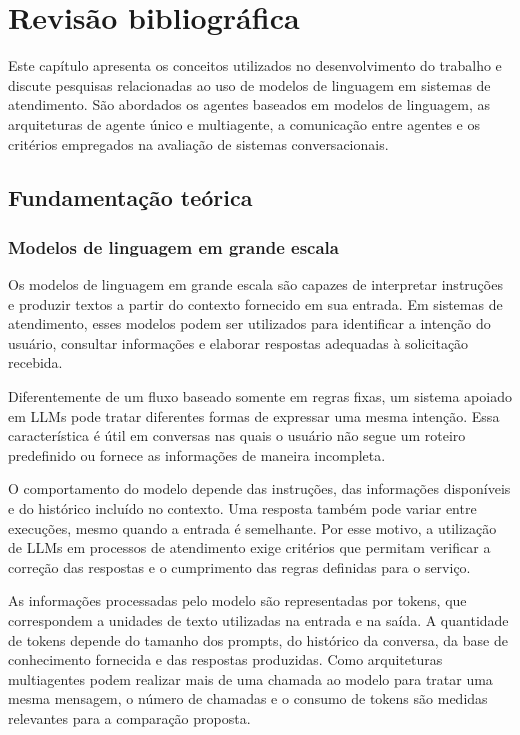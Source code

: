 \chapter{Revisão bibliográfica}\label{cap:revisao}

Este capítulo apresenta os conceitos utilizados no desenvolvimento do trabalho e discute pesquisas relacionadas ao uso de modelos de linguagem em sistemas de atendimento. São abordados os agentes baseados em modelos de linguagem, as arquiteturas de agente único e multiagente, a comunicação entre agentes e os critérios empregados na avaliação de sistemas conversacionais.

\section{Fundamentação teórica}\label{sec:fundamentacao}

\subsection{Modelos de linguagem em grande escala}
\label{subsec:llm}

Os modelos de linguagem em grande escala são capazes de interpretar instruções e produzir textos a partir do contexto fornecido em sua entrada. Em sistemas de atendimento, esses modelos podem ser utilizados para identificar a intenção do usuário, consultar informações e elaborar respostas adequadas à solicitação recebida.

Diferentemente de um fluxo baseado somente em regras fixas, um sistema apoiado em \glspl{LLM} pode tratar diferentes formas de expressar uma mesma intenção. Essa característica é útil em conversas nas quais o usuário não segue um roteiro predefinido ou fornece as informações de maneira incompleta.

O comportamento do modelo depende das instruções, das informações disponíveis e do histórico incluído no contexto. Uma resposta também pode variar entre execuções, mesmo quando a entrada é semelhante. Por esse motivo, a utilização de \glspl{LLM} em processos de atendimento exige critérios que permitam verificar a correção das respostas e o cumprimento das regras definidas para o serviço.

As informações processadas pelo modelo são representadas por tokens, que correspondem a unidades de texto utilizadas na entrada e na saída. A quantidade de tokens depende do tamanho dos prompts, do histórico da conversa, da base de conhecimento fornecida e das respostas produzidas. Como arquiteturas multiagentes podem realizar mais de uma chamada ao modelo para tratar uma mesma mensagem, o número de chamadas e o consumo de tokens são medidas relevantes para a comparação proposta.

